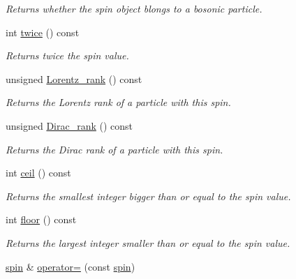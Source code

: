 \begin{DoxyCompactItemize}
\begin{DoxyCompactList}\small\item\em Returns whether the spin object blongs to a bosonic particle. \end{DoxyCompactList}\item 
\hypertarget{a00501_a399fd3032b2c9c980f9080203dab2057}{int \hyperlink{a00501_a399fd3032b2c9c980f9080203dab2057}{twice} () const }\label{a00501_a399fd3032b2c9c980f9080203dab2057}

\begin{DoxyCompactList}\small\item\em Returns twice the spin value. \end{DoxyCompactList}\item 
\hypertarget{a00501_a72c78776eabc7b9bf895219717450b7a}{unsigned \hyperlink{a00501_a72c78776eabc7b9bf895219717450b7a}{Lorentz\-\_\-rank} () const }\label{a00501_a72c78776eabc7b9bf895219717450b7a}

\begin{DoxyCompactList}\small\item\em Returns the Lorentz rank of a particle with this spin. \end{DoxyCompactList}\item 
\hypertarget{a00501_a18e7b1c5f0fba2eb29ecee7bad08bab3}{unsigned \hyperlink{a00501_a18e7b1c5f0fba2eb29ecee7bad08bab3}{Dirac\-\_\-rank} () const }\label{a00501_a18e7b1c5f0fba2eb29ecee7bad08bab3}

\begin{DoxyCompactList}\small\item\em Returns the Dirac rank of a particle with this spin. \end{DoxyCompactList}\item 
\hypertarget{a00501_acc34f6693dc9862b43e0aaef5a9b8ec1}{int \hyperlink{a00501_acc34f6693dc9862b43e0aaef5a9b8ec1}{ceil} () const }\label{a00501_acc34f6693dc9862b43e0aaef5a9b8ec1}

\begin{DoxyCompactList}\small\item\em Returns the smallest integer bigger than or equal to the spin value. \end{DoxyCompactList}\item 
\hypertarget{a00501_a01950bfd7d5d48ec3d4bbfdc358cea72}{int \hyperlink{a00501_a01950bfd7d5d48ec3d4bbfdc358cea72}{floor} () const }\label{a00501_a01950bfd7d5d48ec3d4bbfdc358cea72}

\begin{DoxyCompactList}\small\item\em Returns the largest integer smaller than or equal to the spin value. \end{DoxyCompactList}\item 
\hypertarget{a00501_aeaf26210a7057e30ca81afb21359538a}{\hyperlink{a00501}{spin} \& \hyperlink{a00501_aeaf26210a7057e30ca81afb21359538a}{operator=} (const \hyperlink{a00501}{spin})}\label{a00501_aeaf26210a7057e30ca81afb21359538a}


\end{DoxyCompactItemize}
